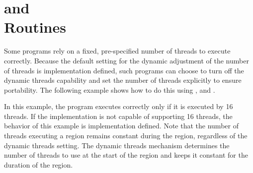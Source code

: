 \section{ and \\
 Routines}
\label{sec:set_dynamic_nthrs}

Some programs rely on a fixed, pre-specified number of threads to execute correctly. 
Because the default setting for the dynamic adjustment of the number of threads 
is implementation defined, such programs can choose to turn off the dynamic threads 
capability and set the number of threads explicitly to ensure portability. The 
following example shows how to do this using , and .

In this example, the program executes correctly only if it is executed by 16 threads. 
If the implementation is not capable of supporting 16 threads, the behavior of 
this example is implementation defined. Note that the number of threads executing 
a  region remains constant during the region, regardless of the 
dynamic threads setting. The dynamic threads mechanism determines the number of 
threads to use at the start of the  region and keeps it constant 
for the duration of the region.




